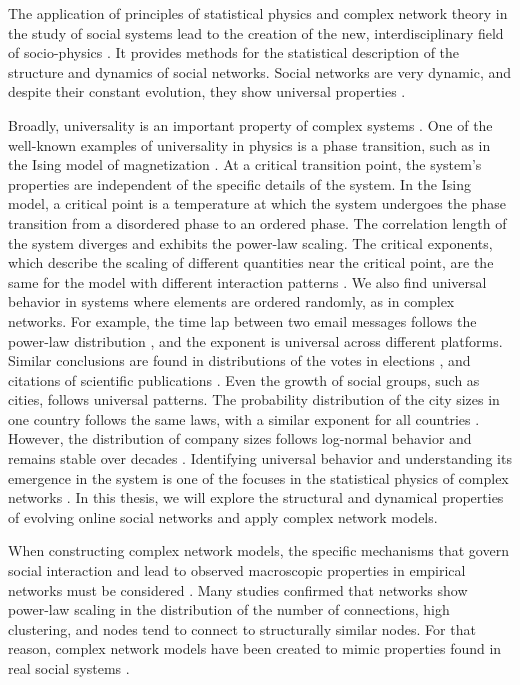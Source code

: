 The application of principles of statistical physics and complex network theory in the study of social systems lead to the creation of the new, interdisciplinary field of socio-physics \cite{sen2014sociophysics}. It provides methods for the statistical description of the structure and dynamics of social networks. Social networks are very dynamic, and despite their constant evolution, they show universal properties \cite{schweitzer2018sociophysics}.

Broadly, universality is an important property of complex systems \cite{binney1992}. One of the well-known examples of universality in physics is a phase transition, such as in the Ising model of magnetization \cite{sethna2021statistical}. At a critical transition point, the system's properties are independent of the specific details of the system. In the Ising model, a critical point is a temperature at which the system undergoes the phase transition from a disordered phase to an ordered phase. The correlation length of the system diverges and exhibits the power-law scaling. The critical exponents, which describe the scaling of different quantities near the critical point, are the same for the model with different interaction patterns \cite{kadanoff1990scaling}. 
We also find universal behavior in systems where elements are ordered randomly, as in complex networks. For example, the time lap between two email messages follows the power-law distribution \cite{garas2012emotional}, and the exponent is universal across different platforms. Similar conclusions are found in distributions of the votes in elections \cite{fortunato2007scaling, chatterjee2013}, and citations of scientific publications \cite{radicchi2008}. Even the growth of social groups, such as cities, follows universal patterns. The probability distribution of the city sizes in one country follows the same laws, with a similar exponent for all countries \cite{barthelemy2019, fazio2015pareto}. However, the distribution of company sizes follows log-normal behavior and remains stable over decades \cite{amaral1997scaling, stanley1996scaling}. Identifying universal behavior and understanding its emergence in the system is one of the focuses in the statistical physics of complex networks \cite{verbavatz2020}. %
In this thesis, we will explore the structural and dynamical properties of evolving online social networks and apply complex network models.  

When constructing complex network models, the specific mechanisms that govern social interaction and lead to observed macroscopic properties in empirical networks must be considered \cite{sen2014sociophysics}. Many studies confirmed that networks show power-law scaling in the distribution of the number of connections, high clustering, and nodes tend to connect to structurally similar nodes. For that reason, complex network models have been created to mimic properties found in real social systems \cite{sen2014sociophysics}.

